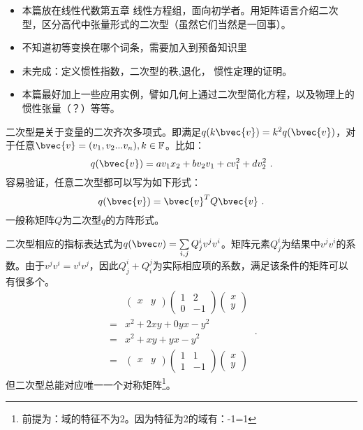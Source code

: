 
\begin{issues}
\issueTODO 
\begin{itemize}
\item 本篇放在线性代数第五章 线性方程组，面向初学者。用矩阵语言介绍二次型，区分高代中张量形式的二次型（虽然它们当然是一回事）。
\item 不知道初等变换在哪个词条，需要加入到预备知识里
\item 未完成：定义惯性指数，二次型的秩,退化， 惯性定理的证明。
\item  本篇最好加上一些应用实例，譬如几何上通过二次型简化方程，以及物理上的惯性张量（？）等等。
\end{itemize}
\end{issues}
\begin{definition}{}
二次型是关于变量的二次齐次多项式。即满足$q(k\bvec{v})=k^2 q(\bvec{v})$，对于任意$\bvec{v}=(v_1,v_2...v_n),k\in \mathbb F$。比如：
\begin{equation}
q(\bvec{v})=av_1x_2+bv_2v_1+cv_1^2+dv_2^2~.
\end{equation}
容易验证，任意二次型都可以写为如下形式：
\begin{equation}
q(\bvec{v})=\bvec{v}^TQ\bvec{v}~.
\end{equation}
一般称矩阵$Q$为二次型$q$的方阵形式。
\end{definition}

二次型相应的指标表达式为$q(\bvec v)=\sum\limits_{i,j}Q^i_j v^j v^i$。矩阵元素$Q^i_j$为结果中$v^j v^i$的系数。由于$v^j v^i=v^i v^j$，因此$Q^i_j+Q^j_i$为实际相应项的系数，满足该条件的矩阵可以有很多个。
\begin{equation}
\begin{aligned}
& \left(\begin{array}{ll}
x & y
\end{array}\right)\left(\begin{array}{cc}
1 & 2 \\
0 & -1
\end{array}\right)\left(\begin{array}{l}
x \\
y
\end{array}\right) \\
= & x^2+2 x y+0 y x-y^2 \\
= & x^2+x y+y x-y^2 \\
= & \left(\begin{array}{ll}
x & y
\end{array}\right)\left(\begin{array}{cc}
1 & 1 \\
1 & -1
\end{array}\right)\left(\begin{array}{l}
x \\
y
\end{array}\right)
\end{aligned}~.
\end{equation}
但二次型总能对应唯一一个对称矩阵\footnote{前提为：域的特征不为2。因为特征为2的域有：-1=1}。
